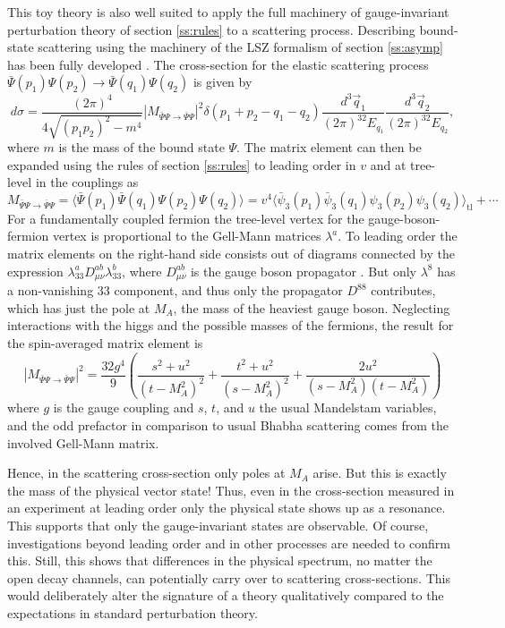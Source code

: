 \documentclass[final,12pt]{article}
\newcommand*{\no}{\noindent}
\newcommand*{\be}{\begin{equation}}
\newcommand*{\ee}{\end{equation}}
\newcommand*{\nn}{\nonumber}
\newcommand*{\1}{1\!\!\!\bot}
\begin{document}
This toy theory is also well suited to apply the full machinery of gauge-invariant perturbation theory of section \ref{ss:rules} to a scattering process. Describing bound-state scattering using the machinery of the LSZ formalism of section \ref{ss:asymp} has been fully developed \cite{Bohm:2001yx}. The cross-section for the elastic scattering process $\bar{\Psi}(p_1)\Psi(p_2)\to\bar{\Psi}(q_1)\Psi(q_2)$ is given by
\be
d\sigma=\frac{(2\pi)^4}{4\sqrt{(p_1p_2)^2-m^4}}|M_{\bar{\Psi}\Psi\to\bar{\Psi}\Psi}|^2\delta(p_1+p_2-q_1-q_2)\frac{d^3\vec q_1}{(2\pi)^32E_{q_1}}\frac{d^3\vec q_2}{(2\pi)^32E_{q_2}}\nn,
\ee
\no where $m$ is the mass of the bound state $\Psi$. The matrix element can then be expanded using the rules of section \ref{ss:rules} to leading order in $v$ and at tree-level in the couplings as
\be
M_{\bar{\Psi}\Psi\to\bar{\Psi}\Psi}=\big\langle\bar{\Psi}(p_1)\bar{\Psi}(q_1)\Psi(p_2)\Psi(q_2)\big\rangle =v^4\big\langle\bar{\psi}_3(p_1)\bar{\psi}_3(q_1)\psi_3(p_2)\psi_3(q_2)\big\rangle_\mathrm{tl}+\cdots\;\nn
\ee
\no For a fundamentally coupled fermion the tree-level vertex for the gauge-boson-fermion vertex is proportional to the Gell-Mann matrices $\lambda^a$. To leading order the matrix elements on the right-hand side consists out of diagrams connected by the expression $\lambda_{33}^aD_{\mu\nu}^{ab}\lambda_{33}^b$, where $D_{\mu\nu}^{ab}$ is the gauge boson propagator \cite{Bohm:2001yx}. But only $\lambda^8$ has a non-vanishing $33$ component, and thus only the propagator $D^{88}$ contributes, which has just the pole at $M_A$, the mass of the heaviest gauge boson. Neglecting interactions with the higgs and the possible masses of the fermions, the result for the spin-averaged matrix element is
\be
|M_{\bar{\Psi}\Psi\to\bar{\Psi}\Psi}|^2=\frac{32g^4}{9}\left(\frac{s^2+u^2}{(t-M_A^2)^2}+\frac{t^2+u^2}{(s-M_A^2)^2}+\frac{2u^2}{(s-M_A^2)(t-M_A^2)}\right)\nn
\ee
\no where $g$ is the gauge coupling and $s$, $t$, and $u$ the usual Mandelstam variables, and the odd prefactor in comparison to usual Bhabha scattering comes from the involved Gell-Mann matrix.

Hence, in the scattering cross-section only poles at $M_A$ arise. But this is exactly the mass of the physical vector state! Thus, even in the cross-section measured in an experiment at leading order only the physical state shows up as a resonance. This supports that only the gauge-invariant states are observable. Of course, investigations beyond leading order and in other processes are needed to confirm this. Still, this shows that differences in the physical spectrum, no matter the open decay channels, can potentially carry over to scattering cross-sections. This would deliberately alter the signature of a theory qualitatively compared to the expectations in standard perturbation theory.
\end{document}
